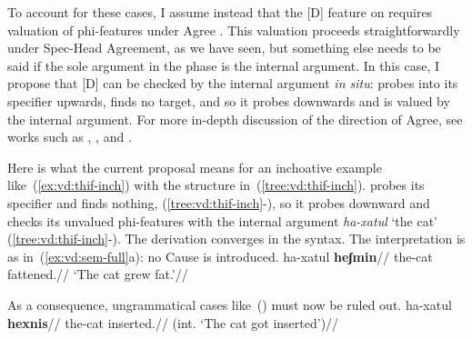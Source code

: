 To account for these cases, I assume instead that the [D] feature on {\vd} requires valuation of phi-features under Agree \citep{nie17,schaefer17oup}. This valuation proceeds straightforwardly under Spec-Head Agreement, as we have seen, but something else needs to be said if the sole argument in the phase is the internal argument. In this case, I propose that [D] can be checked by the internal argument \emph{in situ}: {\vd} probes into its specifier upwards, finds no target, and so it probes downwards and is valued by the internal argument. For more in-depth discussion of the direction of Agree, see works such as \cite{bejarrezac09}, \cite{zeijlstra12}, \cite{preminger13tlr} and \cite{deal15nels}.

Here is what the current proposal means for an inchoative example like~(\ref{ex:vd:thif-inch}) with the structure in~(\ref{tree:vd:thif-inch}). {\vd} probes its specifier and finds nothing, (\ref{tree:vd:thif-inch}-), so it probes downward and checks its unvalued phi-features with the internal argument \emph{ha-xatul} `the cat' (\ref{tree:vd:thif-inch}-). The derivation converges in the syntax. The interpretation is as in~(\ref{ex:vd:sem-full}a): no Cause is introduced.
\ex\label{ex:vd:thif-inch} \begingl
	\gla ha-xatul \textbf{heʃmin}//
	\glb the-cat fattened.//
	\glft `The cat grew fat.'//
	\endgl
\xe
	
	\ex\label{tree:vd:thif-inch}
	\xe
\bigskip

As a consequence, ungrammatical cases like~(\nextx) must now be ruled out.
\pex\label{ex:counterex}
	\a \ljudge{*}
		\begingl
		\gla ha-xatul \textbf{hexnis}//
		\glb the-cat inserted.//
		\glft (int. `The cat got inserted')//
	\endgl
	
